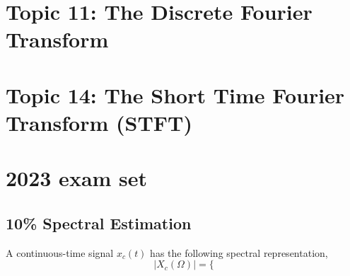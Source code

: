 \documentclass{article}
\begin{document}
\section*{Topic 11: The Discrete Fourier Transform}
\section*{Topic 14: The Short Time Fourier Transform (STFT)}

\section*{2023 exam set}
\subsection{10\% Spectral Estimation}
A continuous-time signal $x_c(t)$ has the following spectral representation,
\begin{equation}
	|X_c(\Omega)|=\{
\end{equation}
\end{document}
